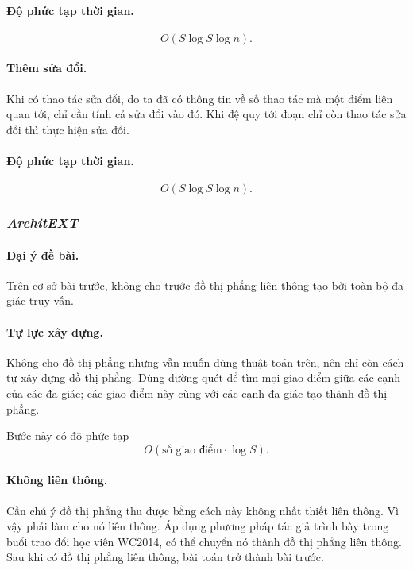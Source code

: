 \documentclass[11pt]{article}
\begin{document}
\paragraph{Độ phức tạp thời gian.}
\[
  O(S\log S\log n).
\]

\paragraph{Thêm sửa đổi.}
Khi có thao tác sửa đổi, do ta đã có thông tin về số thao tác mà một điểm liên
quan tới, chỉ cần tính cả sửa đổi vào đó. Khi đệ quy tới đoạn chỉ còn thao tác
sửa đổi thì thực hiện sửa đổi.

\paragraph{Độ phức tạp thời gian.}
\[
  O(S\log S\log n).
\]

\subsubsection{\emph{ArchitEXT}}

\paragraph{Đại ý đề bài.}
Trên cơ sở bài trước, không cho trước đồ thị phẳng liên thông tạo bởi toàn bộ
đa giác truy vấn.

\paragraph{Tự lực xây dựng.}
Không cho đồ thị phẳng nhưng vẫn muốn dùng thuật toán trên, nên chỉ còn cách tự
xây dựng đồ thị phẳng. Dùng đường quét để tìm mọi giao điểm giữa các cạnh của
các đa giác; các giao điểm này cùng với các cạnh đa giác tạo thành đồ thị phẳng.

Bước này có độ phức tạp
\[
  O(\text{số giao điểm}\cdot\log S).
\]

\paragraph{Không liên thông.}
Cần chú ý đồ thị phẳng thu được bằng cách này không nhất thiết liên thông. Vì
vậy phải làm cho nó liên thông. Áp dụng phương pháp tác giả trình bày trong buổi
trao đổi học viên WC2014, có thể chuyển nó thành đồ thị phẳng liên thông. Sau
khi có đồ thị phẳng liên thông, bài toán trở thành bài trước.
\end{document}
